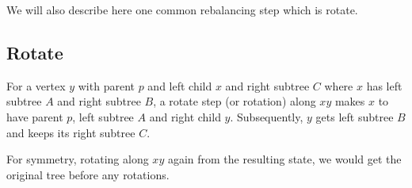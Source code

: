 We will also describe here one common rebalancing step which is rotate.

\subsection*{Rotate}

For a vertex $y$ with parent $p$ and left child $x$ and right subtree $C$ where $x$ has left subtree $A$ and right subtree $B$, a rotate step (or rotation) along $xy$ makes $x$ to have parent $p$, left subtree $A$ and right child $y$. Subsequently, $y$ gets left subtree $B$ and keeps its right subtree $C$.

For symmetry, rotating along $xy$ again from the resulting state, we would get the original tree before any rotations.


